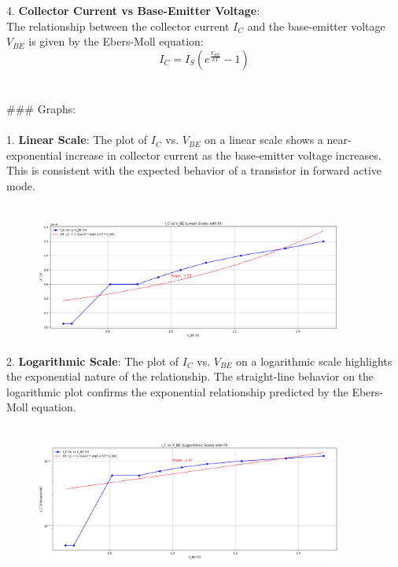 \documentclass{article}
\begin{document}
4. \textbf{Collector Current vs Base-Emitter Voltage}:
\\
The relationship between the collector current \( I_C \) and the base-emitter voltage \( V_{BE} \) is given by the Ebers-Moll equation:
\\
\[
I_C = I_S \left( e^{\frac{V_{BE}}{kT}} - 1 \right)
\]
\\ \\ 
### Graphs:
\\ \\
1. \textbf{Linear Scale}: The plot of \( I_C \) vs. \( V_{BE} \) on a linear scale shows a near-exponential increase in collector current as the base-emitter voltage increases. This is consistent with the expected behavior of a transistor in forward active mode.
\\ \\ 
\begin{figure}[H]
    \centering
    \includegraphics[width=0.9\textwidth]{./img/Lab5_4_linear.png}
    \caption{}
    \label{fig:graph1} 
\end{figure}

2. \textbf{Logarithmic Scale}: The plot of \( I_C \) vs. \( V_{BE} \) on a logarithmic scale highlights the exponential nature of the relationship. The straight-line behavior on the logarithmic plot confirms the exponential relationship predicted by the Ebers-Moll equation.
\\ \\ 
\begin{figure}[H]
    \centering
    \includegraphics[width=0.9\textwidth]{./img/Lab5_4_Log.png}
    \caption{}
    \label{fig:graph1} 
\end{figure}
\end{document}
